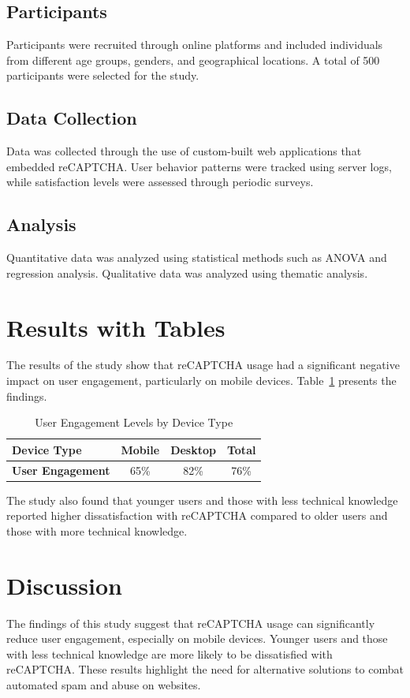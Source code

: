 \documentclass{article}
\begin{document}
\subsection{Participants}
Participants were recruited through online platforms and included individuals from different age groups, genders, and geographical locations. A total of 500 participants were selected for the study.

\subsection{Data Collection}
Data was collected through the use of custom-built web applications that embedded reCAPTCHA. User behavior patterns were tracked using server logs, while satisfaction levels were assessed through periodic surveys.

\subsection{Analysis}
Quantitative data was analyzed using statistical methods such as ANOVA and regression analysis. Qualitative data was analyzed using thematic analysis.

\section{Results with Tables}
The results of the study show that reCAPTCHA usage had a significant negative impact on user engagement, particularly on mobile devices. Table~\ref{table:userEngagement} presents the findings.

\begin{table}[htbp]
\centering
\begin{tabularx}{\linewidth}{|X|c|c|c|}
\hline
\textbf{Device Type} & \textbf{Mobile} & \textbf{Desktop} & \textbf{Total} \\
\hline
\textbf{User Engagement} & 65\% & 82\% & 76\% \\
\hline
\end{tabularx}
\caption{User Engagement Levels by Device Type}
\label{table:userEngagement}
\end{table}

The study also found that younger users and those with less technical knowledge reported higher dissatisfaction with reCAPTCHA compared to older users and those with more technical knowledge.

\section{Discussion}
The findings of this study suggest that reCAPTCHA usage can significantly reduce user engagement, especially on mobile devices. Younger users and those with less technical knowledge are more likely to be dissatisfied with reCAPTCHA. These results highlight the need for alternative solutions to combat automated spam and abuse on websites.
\end{document}
